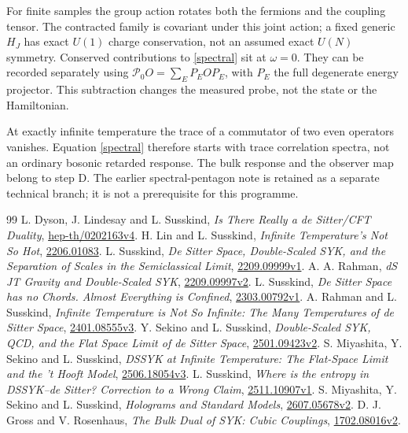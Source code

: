 \documentclass[11pt,a4paper]{article}
\begin{document}
For finite samples the group action rotates both the fermions and the
coupling tensor. The contracted family is covariant under this joint
action; a fixed generic $H_J$ has exact $U(1)$ charge conservation, not
an assumed exact $U(N)$ symmetry. Conserved contributions to
\eqref{spectral} sit at $\omega=0$. They can be recorded separately
using $\mathcal P_0O=\sum_E P_EOP_E$, with $P_E$ the full degenerate
energy projector. This subtraction changes the measured probe, not the
state or the Hamiltonian.

At exactly infinite temperature the trace of a commutator of two even
operators vanishes. Equation \eqref{spectral} therefore starts with
trace correlation spectra, not an ordinary bosonic retarded response.
The bulk response and the observer map belong to step D.
The earlier spectral-pentagon note is retained as a separate technical
branch; it is not a prerequisite for this programme.

\newpage
\begin{thebibliography}{99}\small
{} L. Dyson, J. Lindesay and L. Susskind,
\emph{Is There Really a de Sitter/CFT Duality},
\href{https://arxiv.org/abs/hep-th/0202163v4}{hep-th/0202163v4}.
 H. Lin and L. Susskind, \emph{Infinite Temperature's Not
So Hot}, \href{https://arxiv.org/abs/2206.01083}{2206.01083}.
 L. Susskind, \emph{De Sitter Space, Double-Scaled
SYK, and the Separation of Scales in the Semiclassical Limit},
\href{https://arxiv.org/abs/2209.09999v1}{2209.09999v1}.
 A. A. Rahman, \emph{dS JT Gravity and Double-Scaled
SYK}, \href{https://arxiv.org/abs/2209.09997v2}{2209.09997v2}.
 L. Susskind, \emph{De Sitter Space has no Chords.
Almost Everything is Confined},
\href{https://arxiv.org/abs/2303.00792v1}{2303.00792v1}.
 A. Rahman and L. Susskind, \emph{Infinite
Temperature is Not So Infinite: The Many Temperatures of de Sitter Space},
\href{https://arxiv.org/abs/2401.08555v3}{2401.08555v3}.
 Y. Sekino and L. Susskind, \emph{Double-Scaled SYK,
QCD, and the Flat Space Limit of de Sitter Space},
\href{https://arxiv.org/abs/2501.09423v2}{2501.09423v2}.
 S. Miyashita, Y. Sekino and L. Susskind,
\emph{DSSYK at Infinite Temperature: The Flat-Space Limit and the
't Hooft Model}, \href{https://arxiv.org/abs/2506.18054v3}{2506.18054v3}.
 L. Susskind, \emph{Where is the entropy in
DSSYK--de Sitter? Correction to a Wrong Claim},
\href{https://arxiv.org/abs/2511.10907v1}{2511.10907v1}.
 S. Miyashita, Y. Sekino and L. Susskind,
\emph{Holograms and Standard Models},
\href{https://arxiv.org/abs/2607.05678v2}{2607.05678v2}.
 D. J. Gross and V. Rosenhaus, \emph{The Bulk Dual
of SYK: Cubic Couplings},
\href{https://arxiv.org/abs/1702.08016v2}{1702.08016v2}.
\end{thebibliography}
\end{document}
